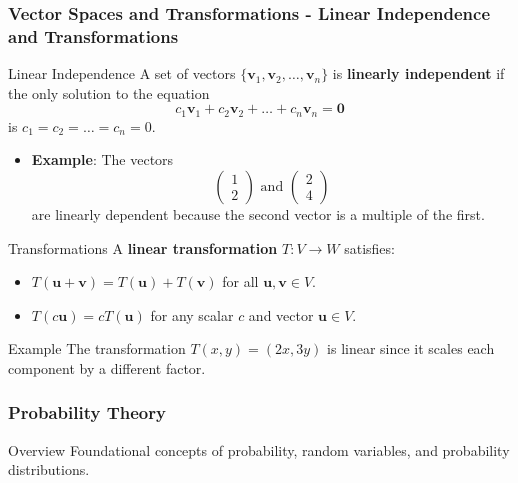 \documentclass[aspectratio=169]{beamer}
\begin{document}
\begin{frame}[fragile]
    \frametitle{Vector Spaces and Transformations - Linear Independence and Transformations}
    \begin{block}{Linear Independence}
        A set of vectors \( \{\mathbf{v}_1, \mathbf{v}_2, \ldots, \mathbf{v}_n\} \) is \textbf{linearly independent} if the only solution to the equation
        \[
        c_1 \mathbf{v}_1 + c_2 \mathbf{v}_2 + \ldots + c_n \mathbf{v}_n = \mathbf{0}
        \]
        is \( c_1 = c_2 = \ldots = c_n = 0 \).
    \end{block}
    \begin{itemize}
        \item \textbf{Example}: The vectors 
        \[
        \begin{pmatrix} 1 \\ 2 \end{pmatrix} \text{ and } \begin{pmatrix} 2 \\ 4 \end{pmatrix}
        \]
        are linearly dependent because the second vector is a multiple of the first.
    \end{itemize}
    \begin{block}{Transformations}
        A \textbf{linear transformation} \( T: V \to W \) satisfies:
        \begin{itemize}
            \item \( T(\mathbf{u} + \mathbf{v}) = T(\mathbf{u}) + T(\mathbf{v}) \) for all \( \mathbf{u}, \mathbf{v} \in V \).
            \item \( T(c\mathbf{u}) = cT(\mathbf{u}) \) for any scalar \( c \) and vector \( \mathbf{u} \in V \).
        \end{itemize}
        \begin{block}{Example}
            The transformation \( T(x, y) = (2x, 3y) \) is linear since it scales each component by a different factor.
        \end{block}
    \end{block}
\end{frame}

\begin{frame}[fragile]
    \frametitle{Probability Theory}
    \begin{block}{Overview}
        Foundational concepts of probability, random variables, and probability distributions.
    \end{block}
\end{frame}
\end{document}

